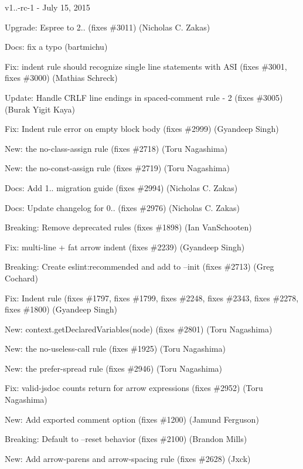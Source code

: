 v1..-\/rc-\/1 -\/ July 15, 2015


\begin{DoxyItemize}
\item Upgrade\+: Espree to 2.. (fixes \#3011) (Nicholas C. Zakas)
\item Docs\+: fix a typo (bartmichu)
\item Fix\+: indent rule should recognize single line statements with A\+SI (fixes \#3001, fixes \#3000) (Mathias Schreck)
\item Update\+: Handle C\+R\+LF line endings in spaced-\/comment rule -\/ 2 (fixes \#3005) (Burak Yigit Kaya)
\item Fix\+: Indent rule error on empty block body (fixes \#2999) (Gyandeep Singh)
\item New\+: the {\ttfamily no-\/class-\/assign} rule (fixes \#2718) (Toru Nagashima)
\item New\+: the {\ttfamily no-\/const-\/assign} rule (fixes \#2719) (Toru Nagashima)
\item Docs\+: Add 1.. migration guide (fixes \#2994) (Nicholas C. Zakas)
\item Docs\+: Update changelog for 0.. (fixes \#2976) (Nicholas C. Zakas)
\item Breaking\+: Remove deprecated rules (fixes \#1898) (Ian Van\+Schooten)
\item Fix\+: multi-\/line + fat arrow indent (fixes \#2239) (Gyandeep Singh)
\item Breaking\+: Create eslint\+:recommended and add to --init (fixes \#2713) (Greg Cochard)
\item Fix\+: Indent rule (fixes \#1797, fixes \#1799, fixes \#2248, fixes \#2343, fixes \#2278, fixes \#1800) (Gyandeep Singh)
\item New\+: {\ttfamily context.\+get\+Declared\+Variables(node)} (fixes \#2801) (Toru Nagashima)
\item New\+: the {\ttfamily no-\/useless-\/call} rule (fixes \#1925) (Toru Nagashima)
\item New\+: the {\ttfamily prefer-\/spread} rule (fixes \#2946) (Toru Nagashima)
\item Fix\+: {\ttfamily valid-\/jsdoc} counts {\ttfamily return} for arrow expressions (fixes \#2952) (Toru Nagashima)
\item New\+: Add exported comment option (fixes \#1200) (Jamund Ferguson)
\item Breaking\+: Default to --reset behavior (fixes \#2100) (Brandon Mills)
\item New\+: Add arrow-\/parens and arrow-\/spacing rule (fixes \#2628) (Jxck)

\end{DoxyItemize}
